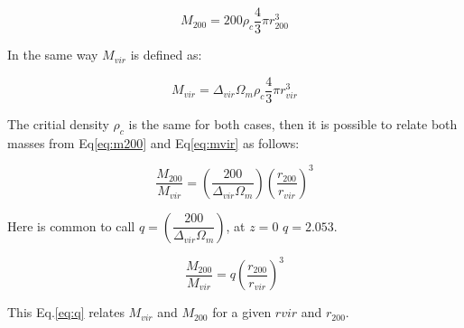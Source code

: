 \begin{equation}\label{eq:m200}
M_{200} = 200 \rho_c \dfrac{4}{3} \pi r_{200}^3
\end{equation}

In the same way $M_{vir}$ is defined as:

\begin{equation}\label{eq:mvir}
M_{vir} = \Delta_{vir} \Omega_m \rho_c \dfrac{4}{3} \pi r_{vir}^3
\end{equation}

The critial density $\rho_c$ is the same for both cases, then it is possible
to relate both masses from Eq\ref{eq:m200} and Eq\ref{eq:mvir} as follows:

\begin{equation}
\dfrac{M_{200}}{M_{vir}} = \left(  \dfrac{200}{ \Delta_{vir} \Omega_m}  \right) \left( \dfrac{r_{200}}{r_{vir}}  \right)^3
\end{equation}

Here is common to call $q = \left(  \dfrac{200}{ \Delta_{vir} \Omega_m}  \right) $,  at $z=0$ $q=2.053$.

\begin{equation}\label{eq:q}
\dfrac{M_{200}}{M_{vir}} = q \left( \dfrac{r_{200}}{r_{vir}}  \right)^3
\end{equation}

This Eq.\ref{eq:q} relates $M_{vir}$ and $M_{200}$ for a given $r{vir}$ and $r_{200}$.

